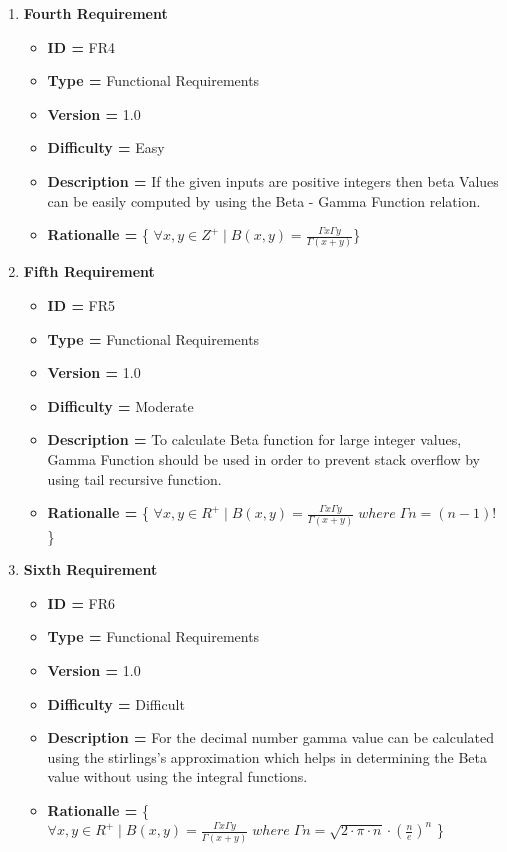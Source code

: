 \documentclass[12pt,a4paper]{report}
\begin{document}
\begin{enumerate}[noitemsep]
        \newpage
        \item \textbf{Fourth Requirement}
        \begin{itemize}
            \item \textbf{ID = } FR4
            \item\textbf{Type = } Functional Requirements
            \item\textbf{Version = } 1.0
            \item\textbf{Difficulty = } Easy
            \item\textbf{Description = } If the given inputs are positive integers then beta Values can be easily computed by using the Beta - Gamma Function relation.
            \item\textbf{Rationalle = } \{ $\forall x,y \in Z^{+} \mid B(x,y) = \frac{\Gamma x \Gamma y}{\Gamma (x+y)} $\}
        \end{itemize}
        \item \textbf{Fifth Requirement}
        \begin{itemize}
            \item \textbf{ID = } FR5
            \item\textbf{Type = } Functional Requirements
            \item\textbf{Version = } 1.0
            \item\textbf{Difficulty = } Moderate
            \item\textbf{Description = } To calculate Beta function for large integer values, Gamma Function should be used in order to prevent stack overflow by using tail recursive function.
            \item\textbf{Rationalle = } \{ $\forall x,y \in R^+ \mid B(x,y) = \frac{{\Gamma x} {\Gamma y}}{\Gamma (x+y)} \; where\; \Gamma n = (n-1)! $ \}
        \end{itemize}
        
        \item \textbf{Sixth Requirement}
        \begin{itemize}
            \item \textbf{ID = } FR6
            \item\textbf{Type = } Functional Requirements
            \item\textbf{Version = } 1.0
            \item\textbf{Difficulty = } Difficult
            \item\textbf{Description = } For the decimal number gamma value can be calculated using the stirlings's approximation which helps in determining the Beta value without using the integral functions.
            \item\textbf{Rationalle = } \{ $\forall x,y \in R^{+} \mid B(x,y) = \frac{{\Gamma x} {\Gamma y}}{\Gamma (x+y)}\;where\; \Gamma n = \sqrt{2 \cdot \pi \cdot n}\cdot (\frac{n}{e})^{n}$ \} 
        \end{itemize}
        

\end{enumerate}
\end{document}
